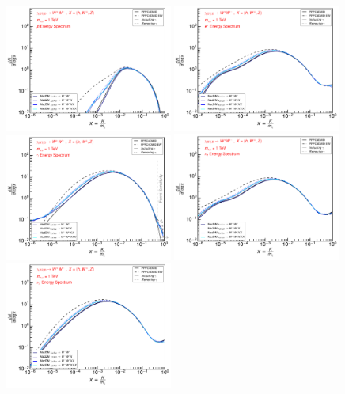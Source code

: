 \documentclass[epj,nopacs,fleqn]{svjour}
\begin{document}
\begin{figure}[!b]
\centering
\subfigure
{ \includegraphics[width=0.49\textwidth]{Fig/1TeV/1_antiprotons_PPPC_Comparison_xdxd_fotone_1.pdf}}
\subfigure
{\includegraphics[width=0.49\textwidth]{Fig/1TeV/1_positrons_PPPC_Comparison_xdxd_fotone_1.pdf}}
\subfigure
{\includegraphics[width=0.49\textwidth]{Fig/1TeV/1_gammas_PPPC_Comparison_xdxd_fotone_1.pdf}}
\subfigure
{\includegraphics[width=0.49\textwidth]{Fig/1TeV/1_neutrinos_e_PPPC_Comparison_xdxd_fotone_1.pdf}}
\subfigure
{\includegraphics[width=0.49\textwidth]{Fig/1TeV/1_neutrinos_mu_PPPC_Comparison_xdxd_fotone_1.pdf}}

\end{figure}
\end{document}

